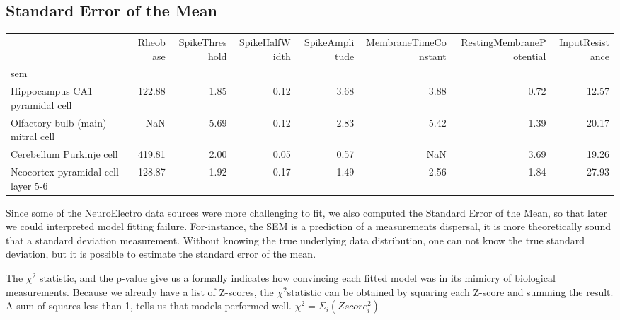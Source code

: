 \subsection{Standard Error of the Mean}
\begin{tabular}{lrrrrrrr}
\toprule
{} &  Rheobase &  SpikeThreshold &  SpikeHalfWidth &  SpikeAmplitude &  MembraneTimeConstant &  RestingMembranePotential &  InputResistance \\
sem                                &           &                 &                 &                 &                       &                           &                  \\
\midrule
Hippocampus CA1 pyramidal cell     &    122.88 &            1.85 &            0.12 &            3.68 &                  3.88 &                      0.72 &            12.57 \\
Olfactory bulb (main) mitral cell  &       NaN &            5.69 &            0.12 &            2.83 &                  5.42 &                      1.39 &            20.17 \\
Cerebellum Purkinje cell           &    419.81 &            2.00 &            0.05 &            0.57 &                   NaN &                      3.69 &            19.26 \\
Neocortex pyramidal cell layer 5-6 &    128.87 &            1.92 &            0.17 &            1.49 &                  2.56 &                      1.84 &            27.93 \\
\bottomrule
\end{tabular}


Since some of the NeuroElectro data sources were more challenging to fit, we also computed the Standard Error of the Mean, so that later we could interpreted model fitting failure. For-instance, the SEM is a prediction of a measurements dispersal, it is more theoretically sound that a standard deviation measurement. Without knowing the true underlying data distribution, one can not know the true standard deviation, but it is possible to estimate the standard error of the mean. 

The $\chi^{2}$ statistic, and the p-value give us a formally indicates how convincing each fitted model was in its mimicry of biological measurements.
Because we already have a list of Z-scores, the $\chi^{2} $statistic can be obtained by squaring each Z-score and summing the result. A sum of squares less than 1, tells us that models performed well.
$\chi^{2}=\Sigma_{i} (Zscore_{i}^{2}) $

